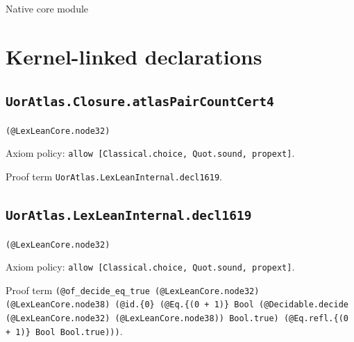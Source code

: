 \documentclass[11pt]{article}
\begin{document}
\begin{center}{\LARGE Native core module}\end{center}
\section*{Kernel-linked declarations}
\subsection*{\texttt{UorAtlas.Closure.atlasPairCountCert4}}
\noindent\texttt{(@LexLeanCore.node32)}\par
\noindent Axiom policy: \texttt{allow [Classical.choice, Quot.sound, propext]}.\par
\noindent Proof term \texttt{UorAtlas.LexLeanInternal.decl1619}.\par
\subsection*{\texttt{UorAtlas.LexLeanInternal.decl1619}}
\noindent\texttt{(@LexLeanCore.node32)}\par
\noindent Axiom policy: \texttt{allow [Classical.choice, Quot.sound, propext]}.\par
\noindent Proof term \texttt{(@of\_decide\_eq\_true (@LexLeanCore.node32) (@LexLeanCore.node38) (@id.\{0\} (@Eq.\{(0 + 1)\} Bool (@Decidable.decide (@LexLeanCore.node32) (@LexLeanCore.node38)) Bool.true) (@Eq.refl.\{(0 + 1)\} Bool Bool.true)))}.\par
\end{document}
